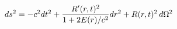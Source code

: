 \documentclass[preview]{standalone}
\begin{document}
\begin{align*}
\special{dvisvgm:raw <g id='unique000'>}ds^2 = -c^2dt^2 + \frac{R'(r,t)^2}{1 + 2E(r)/c^2}dr^2 + R(r,t)^2\,d\Omega^2\special{dvisvgm:raw </g>}
\end{align*}
\end{document}
